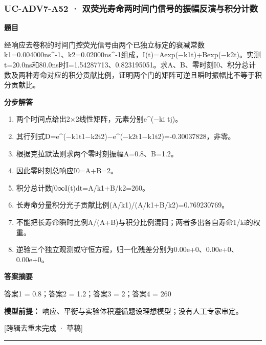 \documentclass[UTF8,11pt,a4paper]{ctexart}
\begin{document}
\subsubsection*{UC-ADV7-A52 · 双荧光寿命两时间门信号的振幅反演与积分计数}
\noindent\textbf{题目}\par
经响应去卷积的时间门控荧光信号由两个已独立标定的衰减常数k1=0.004000ns\textasciicircum{}-1、k2=0.02000ns\textasciicircum{}-1组成，I(t)=Aexp(−k1t)+Bexp(−k2t)。实测t=20.0ns和80.0ns时I=1.54287713、0.823195051。求A、B、零时刻I0、积分总计数及两种寿命对应的积分贡献比例，证明两个门的矩阵可逆且瞬时振幅比不等于积分贡献比。\par
\medskip\noindent\textbf{分步解答}
\begin{enumerate}
\item 两个时间点给出2×2线性矩阵，元素分别e\textasciicircum{}(−ki tj)。
\item 其行列式D=e\textasciicircum{}(−k1t1−k2t2)−e\textasciicircum{}(−k2t1−k1t2)=-0.30037828，非零。
\item 根据克拉默法则求两个零时刻振幅A=0.8、B=1.2。
\item 因此零时刻总响应I0=A+B=2。
\item 积分总计数∫0∞I(t)dt=A/k1+B/k2=260。
\item 长寿命分量积分光子贡献比例(A/k1)/(A/k1+B/k2)=0.769230769。
\item 不能把长寿命瞬时比例A/(A+B)与积分比例混同；两者多出各自寿命1/ki的权重。
\item 逆验三个独立观测或守恒方程，归一化残差分别为0.00e+0、0.00e+0、0.00e+0。
\end{enumerate}
\noindent\textbf{答案摘要}\par
答案1 = 0.8；答案2 = 1.2；答案3 = 2；答案4 = 260\par
\noindent\textbf{模型前提：}
响应、平衡与实验体积遵循题设理想模型；没有人工专家审定。\par
\noindent\textcolor{red!65!black}{[跨辑去重未完成 · 草稿]} \par
\medskip\hrule\medskip
{}
\end{document}
